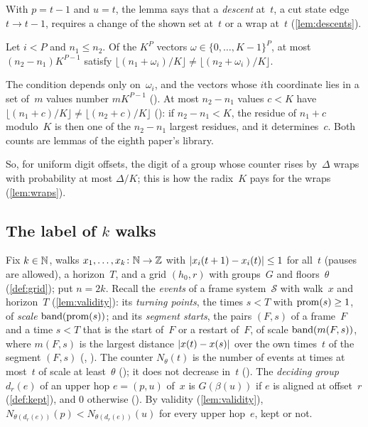 With $p=t-1$ and $u=t$, the lemma says that a \emph{descent} at~$t$, a cut state edge $t\to t-1$, requires a change of the shown
set at~$t$ or a wrap at~$t$ (\cref{lem:descents}).

\begin{lemma}\label{lem:wrapoffsets}
Let $i<P$ and $n_1\le n_2$. Of the $K^P$ vectors $\omega\in\{0,\dots,K-1\}^P$, at most $(n_2-n_1)K^{P-1}$ satisfy
$\lfloor(n_1+\omega_i)/K\rfloor\ne\lfloor(n_2+\omega_i)/K\rfloor$.
\end{lemma}

\begin{outline}
The condition depends only on~$\omega_i$, and the vectors whose $i$th coordinate lies in a set of~$m$ values number $mK^{P-1}$
(). At most $n_2-n_1$ values $c<K$ have
$\lfloor(n_1+c)/K\rfloor\ne\lfloor(n_2+c)/K\rfloor$ (): if $n_2-n_1<K$, the residue of
$n_1+c$ modulo~$K$ is then one of the $n_2-n_1$ largest residues, and it determines~$c$. Both counts are lemmas of the eighth
paper's library.
\end{outline}

So, for uniform digit offsets, the digit of a group whose counter rises by~$\Delta$ wraps with probability at most $\Delta/K$; this
is how the radix~$K$ pays for the wraps (\cref{lem:wraps}).

\subsection{The label of $k$ walks}\label{sec:label-global}

Fix $k\in\mathbb{N}$, walks $x_1,\dots,x_k\colon\mathbb{N}\to\mathbb{Z}$ with $\lvert x_i(t+1)-x_i(t) \rvert\le1$ for all~$t$ (pauses are allowed), a
horizon~$T$, and a grid $(h_0,r)$ with groups~$G$ and floors~$\theta$ (\cref{def:grid}); put $n=2k$. Recall the \emph{events}
of a frame system~$\mathcal S$ with walk~$x$ and horizon~$T$ (\cref{lem:validity}): its \emph{turning points}, the times $s<T$
with $\operatorname{prom}(s)\ge1$, of \emph{scale} $\operatorname{band}(\operatorname{prom}(s))$; and its \emph{segment starts}, the pairs $(F,s)$ of a frame~$F$ and a
time $s<T$ that is the start of~$F$ or a restart of~$F$, of scale $\operatorname{band}(m(F,s))$, where $m(F,s)$ is the largest distance
$\lvert x(t)-x(s) \rvert$ over the own times~$t$ of the segment $(F,s)$ (, ). The counter $N_\theta(t)$
is the number of events at times at most~$t$ of scale at least~$\theta$ (); it does not decrease in~$t$
(). The \emph{deciding group} $d_r(e)$ of an upper hop $e=(p,u)$ of~$x$ is $G(\beta(u))$ if $e$ is aligned
at offset~$r$ (\cref{def:kept}), and $0$ otherwise (). By validity (\cref{lem:validity}),
$N_{\theta(d_r(e))}(p)<N_{\theta(d_r(e))}(u)$ for every upper hop~$e$, kept or not.

